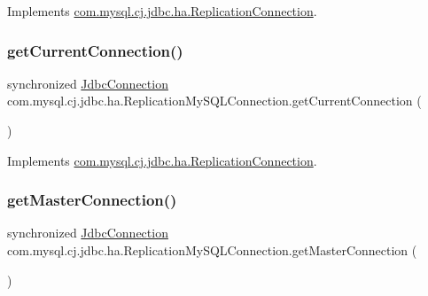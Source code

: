 Implements \mbox{\hyperlink{interfacecom_1_1mysql_1_1cj_1_1jdbc_1_1ha_1_1_replication_connection_a5010d921918f0ed6d8776fe44541a37c}{com.\+mysql.\+cj.\+jdbc.\+ha.\+Replication\+Connection}}.

\mbox{\label{classcom_1_1mysql_1_1cj_1_1jdbc_1_1ha_1_1_replication_my_s_q_l_connection_a0d98dee5ddb333ca8f8cab2f41755205}} 
\subsubsection{\texorpdfstring{get\+Current\+Connection()}{getCurrentConnection()}}
{\footnotesize\ttfamily synchronized \mbox{\hyperlink{interfacecom_1_1mysql_1_1cj_1_1jdbc_1_1_jdbc_connection}{Jdbc\+Connection}} com.\+mysql.\+cj.\+jdbc.\+ha.\+Replication\+My\+S\+Q\+L\+Connection.\+get\+Current\+Connection (\begin{DoxyParamCaption}{ }\end{DoxyParamCaption})}



Implements \mbox{\hyperlink{interfacecom_1_1mysql_1_1cj_1_1jdbc_1_1ha_1_1_replication_connection_a0bfb42722305b18722f782067f85d538}{com.\+mysql.\+cj.\+jdbc.\+ha.\+Replication\+Connection}}.

\mbox{\label{classcom_1_1mysql_1_1cj_1_1jdbc_1_1ha_1_1_replication_my_s_q_l_connection_ac5b7f61a6500ebb3006957d7f32f407d}} 
\subsubsection{\texorpdfstring{get\+Master\+Connection()}{getMasterConnection()}}
{\footnotesize\ttfamily synchronized \mbox{\hyperlink{interfacecom_1_1mysql_1_1cj_1_1jdbc_1_1_jdbc_connection}{Jdbc\+Connection}} com.\+mysql.\+cj.\+jdbc.\+ha.\+Replication\+My\+S\+Q\+L\+Connection.\+get\+Master\+Connection (\begin{DoxyParamCaption}{ }\end{DoxyParamCaption})}



